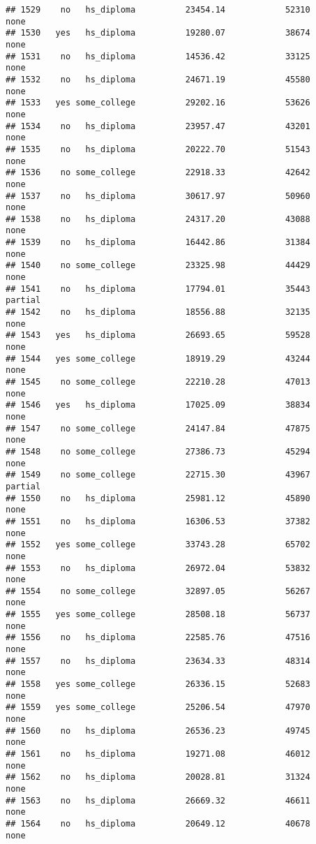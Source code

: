 \documentclass[
]{article}
\begin{document}
\begin{verbatim}
## 1529    no   hs_diploma          23454.14            52310        none
## 1530   yes   hs_diploma          19280.07            38674        none
## 1531    no   hs_diploma          14536.42            33125        none
## 1532    no   hs_diploma          24671.19            45580        none
## 1533   yes some_college          29202.16            53626        none
## 1534    no   hs_diploma          23957.47            43201        none
## 1535    no   hs_diploma          20222.70            51543        none
## 1536    no some_college          22918.33            42642        none
## 1537    no   hs_diploma          30617.97            50960        none
## 1538    no   hs_diploma          24317.20            43088        none
## 1539    no   hs_diploma          16442.86            31384        none
## 1540    no some_college          23325.98            44429        none
## 1541    no   hs_diploma          17794.01            35443     partial
## 1542    no   hs_diploma          18556.88            32135        none
## 1543   yes   hs_diploma          26693.65            59528        none
## 1544   yes some_college          18919.29            43244        none
## 1545    no some_college          22210.28            47013        none
## 1546   yes   hs_diploma          17025.09            38834        none
## 1547    no some_college          24147.84            47875        none
## 1548    no some_college          27386.73            45294        none
## 1549    no some_college          22715.30            43967     partial
## 1550    no   hs_diploma          25981.12            45890        none
## 1551    no   hs_diploma          16306.53            37382        none
## 1552   yes some_college          33743.28            65702        none
## 1553    no   hs_diploma          26972.04            53832        none
## 1554    no some_college          32897.05            56267        none
## 1555   yes some_college          28508.18            56737        none
## 1556    no   hs_diploma          22585.76            47516        none
## 1557    no   hs_diploma          23634.33            48314        none
## 1558   yes some_college          26336.15            52683        none
## 1559   yes some_college          25206.54            47970        none
## 1560    no   hs_diploma          26536.23            49745        none
## 1561    no   hs_diploma          19271.08            46012        none
## 1562    no   hs_diploma          20028.81            31324        none
## 1563    no   hs_diploma          26669.32            46611        none
## 1564    no   hs_diploma          20649.12            40678        none

\end{verbatim}
\end{document}
